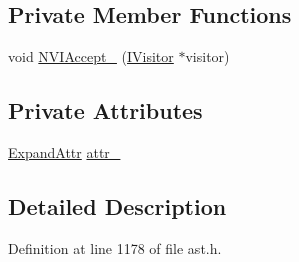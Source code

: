 \subsection*{Private Member Functions}
\begin{DoxyCompactItemize}
\item 
void \hyperlink{classmocha_1_1_class_expandar_aeaf8dc378ea8edfbce4435b01115ef34}{NVIAccept\_\-} (\hyperlink{classmocha_1_1_i_visitor}{IVisitor} $\ast$visitor)
\end{DoxyCompactItemize}
\subsection*{Private Attributes}
\begin{DoxyCompactItemize}
\item 
\hyperlink{classmocha_1_1_class_expandar_ab2e8fbff2016d78e9eb128f90e1fc7df}{ExpandAttr} \hyperlink{classmocha_1_1_class_expandar_a316e97cf34c8653b218b3dd8794442e3}{attr\_\-}
\end{DoxyCompactItemize}


\subsection{Detailed Description}


Definition at line 1178 of file ast.h.



